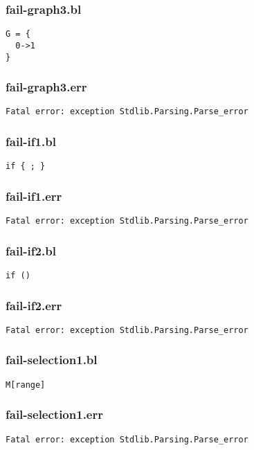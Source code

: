 \subsubsection{fail-graph3.bl}
\begin{lstlisting}
G = {
  0->1
}\end{lstlisting}
\subsubsection{fail-graph3.err}
\begin{lstlisting}
Fatal error: exception Stdlib.Parsing.Parse_error
\end{lstlisting}
\subsubsection{fail-if1.bl}
\begin{lstlisting}
if { ; }\end{lstlisting}
\subsubsection{fail-if1.err}
\begin{lstlisting}
Fatal error: exception Stdlib.Parsing.Parse_error
\end{lstlisting}
\subsubsection{fail-if2.bl}
\begin{lstlisting}
if ()\end{lstlisting}
\subsubsection{fail-if2.err}
\begin{lstlisting}
Fatal error: exception Stdlib.Parsing.Parse_error
\end{lstlisting}
\subsubsection{fail-selection1.bl}
\begin{lstlisting}
M[range]\end{lstlisting}
\subsubsection{fail-selection1.err}
\begin{lstlisting}
Fatal error: exception Stdlib.Parsing.Parse_error
\end{lstlisting}
